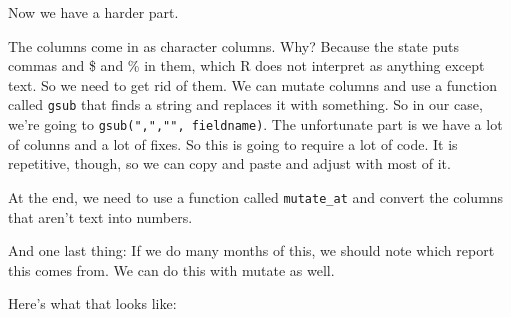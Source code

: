 \documentclass[]{book}
\begin{document}
Now we have a harder part.

The columns come in as character columns. Why? Because the state puts commas and \$ and \% in them, which R does not interpret as anything except text. So we need to get rid of them. We can mutate columns and use a function called \texttt{gsub} that finds a string and replaces it with something. So in our case, we're going to \texttt{gsub(",","",\ fieldname)}. The unfortunate part is we have a lot of colunns and a lot of fixes. So this is going to require a lot of code. It is repetitive, though, so we can copy and paste and adjust with most of it.

At the end, we need to use a function called \texttt{mutate\_at} and convert the columns that aren't text into numbers.

And one last thing: If we do many months of this, we should note which report this comes from. We can do this with mutate as well.

Here's what that looks like:
\end{document}
